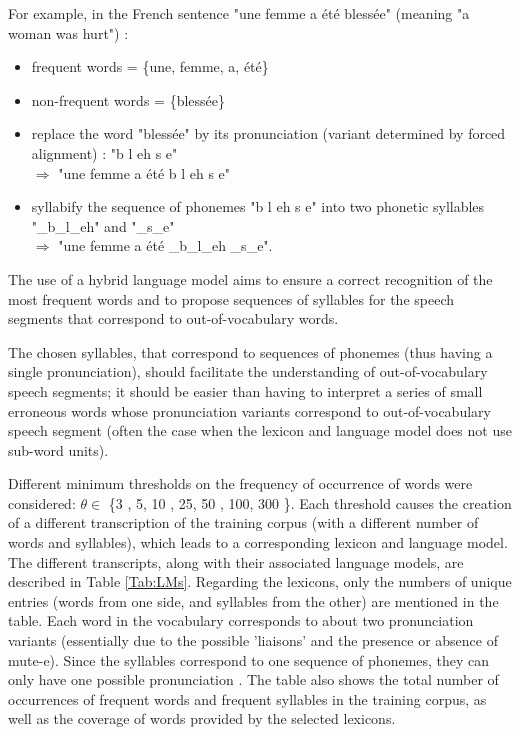 \documentclass[a4paper]{article}
\begin{document}
For example, in the French sentence "une femme a été blessée" (meaning "a woman was hurt") :
\begin{itemize}
\item frequent words = \{une, femme, a, été\}
\item non-frequent words = \{blessée\}
\item replace the word "blessée" by its pronunciation (variant determined by forced alignment) : "b l eh s e"
\vspace{0.05cm} \\ \vspace{0.05cm} $\Rightarrow$ "une \quad femme \quad  a \quad été \quad b \quad  l \quad eh \quad s \quad e"

\item syllabify the sequence of phonemes  "b l eh s e" into two phonetic syllables "\_b\_l\_eh" and "\_s\_e"
\vspace{0.05cm} \\ \vspace{0.05cm} $\Rightarrow$ "une \quad femme \quad a \quad été \quad  \_b\_l\_eh \quad \_s\_e".
\end{itemize}

The use of a hybrid language model aims to ensure a correct recognition of the most frequent words and to propose sequences of syllables for the speech segments that correspond to out-of-vocabulary words.

The chosen syllables, that correspond to sequences of phonemes (thus having a single pronunciation), should facilitate the understanding of out-of-vocabulary speech segments; it should be easier than having to interpret a series of small erroneous words whose pronunciation variants correspond to out-of-vocabulary speech segment (often the case when the lexicon and language model does not use sub-word units).

Different minimum thresholds on the frequency of occurrence of words were considered: $\theta \in$ \{3 , 5, 10 , 25, 50 , 100, 300 \}.
Each threshold causes the creation of a different transcription of the training corpus (with a different number of words and syllables), which leads to a corresponding lexicon and language model.
The different transcripts, along with their associated language models, are described in Table \ref{Tab:LMs}.
Regarding the lexicons, only the numbers of unique entries (words from one side, and syllables from the other) are mentioned in the table.
Each word in the vocabulary corresponds to about two pronunciation variants (essentially due to the possible 'liaisons' and the presence or absence of mute-e).
Since the syllables correspond to one sequence of phonemes, they can only have one possible pronunciation \cite{Orosanu2013_1}.
The table also shows the total number of occurrences of frequent words and frequent syllables in the training corpus, as well as the coverage of words provided by the selected lexicons.
\end{document}
